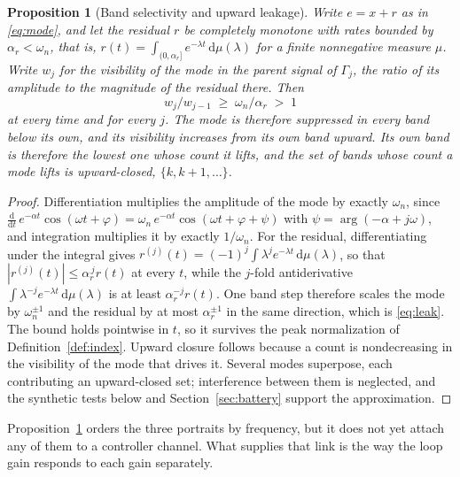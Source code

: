 \documentclass[final,3p,times,twocolumn]{elsarticle}
\newcommand{\rev}[1]{#1}   %
\newcommand{\fix}[1]{#1}  %
\newtheorem{proposition}{Proposition}
\begin{document}
\begin{proposition}[Band selectivity and upward leakage]\label{prop:band}
Write $e = x + r$ as in \eqref{eq:mode}\rev{, and let the residual $r$
be completely monotone with rates bounded by
$\alpha_r<\omega_n$, that is,
$r(t)=\int_{(0,\alpha_r]}e^{-\lambda t}\,\mathrm d\mu(\lambda)$ for a
finite nonnegative measure $\mu$. Write $w_j$ for the visibility of the mode in the parent signal of
$\Gamma_j$, the ratio of its amplitude to the magnitude of the residual
there. Then
\begin{equation}
w_j/w_{j-1} \;\ge\; \omega_n/\alpha_r \;>\; 1
\label{eq:leak}
\end{equation}
at every time and for every $j$. The mode is therefore suppressed in
every band below its own, and its visibility increases from its own band
upward. \fix{Its own band is therefore the lowest one whose count it
lifts, and} the set of bands whose count a mode lifts is upward-closed,
$\{k,k{+}1,\dots\}$}.
\end{proposition}

\rev{\begin{proof}
Differentiation multiplies the amplitude of the mode by exactly
$\omega_n$, since
$\tfrac{\mathrm d}{\mathrm dt}\,e^{-\alpha t}\cos(\omega t+\varphi)
=\omega_n\,e^{-\alpha t}\cos(\omega t+\varphi+\psi)$ with
$\psi=\arg(-\alpha+j\omega)$, and integration multiplies it by exactly
$1/\omega_n$. For the residual, differentiating under the integral gives
$r^{(j)}(t)=(-1)^j\!\int \lambda^j e^{-\lambda t}\,\mathrm d\mu(\lambda)$,
so that $|r^{(j)}(t)|\le\alpha_r^{\,j}r(t)$ at every $t$, while the
$j$-fold antiderivative
$\int \lambda^{-j}e^{-\lambda t}\,\mathrm d\mu(\lambda)$ is at least
$\alpha_r^{-j}r(t)$. One band step therefore scales the mode by
$\omega_n^{\pm1}$ and the residual by at most $\alpha_r^{\pm1}$ in the
same direction, which is \eqref{eq:leak}. The bound holds pointwise in
$t$, so it survives the peak normalization of
Definition~\ref{def:index}. Upward closure follows because a count is nondecreasing in the
visibility of the mode that drives it. Several modes superpose, each
contributing an upward-closed set; interference between them is
neglected, and the synthetic tests below and Section~\ref{sec:battery}
support the approximation.
\end{proof}}

Proposition~\ref{prop:band} orders the three portraits by frequency, but
it does not yet attach any of them to a controller channel. What
supplies that link is the way the loop gain responds to each gain
separately.
\end{document}
